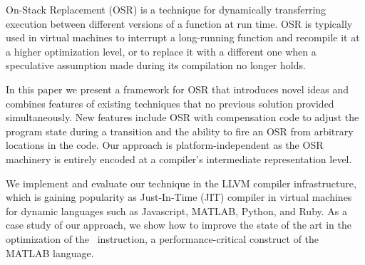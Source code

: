 
On-Stack Replacement (OSR) is a technique for dynamically transferring execution between different versions of a function at run time.
OSR is typically used in virtual machines to interrupt a long-running function and recompile it at a higher optimization level, or to replace it with a different one when a speculative assumption made during its compilation no longer holds.

In this paper we present a framework for OSR that introduces novel ideas and combines features of existing techniques that no previous solution provided simultaneously. New features include OSR with compensation code to adjust the program state during a transition and the ability to fire an OSR from arbitrary locations in the code. Our approach is platform-independent as the OSR machinery is entirely encoded at a compiler's intermediate representation level.



We implement and evaluate our technique in the LLVM compiler infrastructure, which is gaining popularity as Just-In-Time (JIT) compiler in virtual machines for dynamic languages such as Javascript, MATLAB, Python, and Ruby. As a case study of our approach, we show how to improve the state of the art in the optimization of the \feval\ instruction, a performance-critical construct of the MATLAB language.

